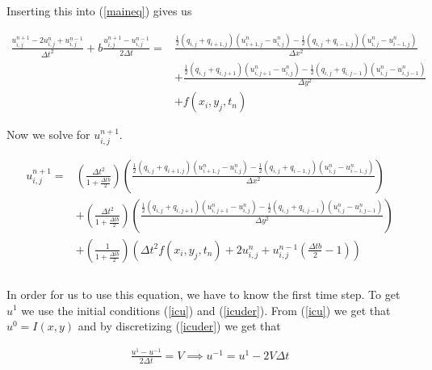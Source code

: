 \documentclass[12pt, a4paper]{article}
\begin{document}
{Inserting this into (\ref{maineq}) gives us

\begin{equation}\label{mainnum}
\begin{aligned}
    \frac{u_{i,j}^{n+1} - 2u_{i,j}^n + u_{i,j}^{n-1}}{\Delta t^2} + b\frac{u_{i,j}^{n+1}- u_{i,j}^{n-1}}{2\Delta t} = &\frac{\frac{1}{2}(q_{i,j} + q_{i+1,j})(u_{i+1,j}^n - u_{i,j}^n) - \frac{1}{2}(q_{i,j} + q_{i-1,j})(u_{i,j}^{n} - u_{i-1,j}^{n})}{\Delta x^2} \\ &+ \frac{\frac{1}{2}(q_{i,j} + q_{i,j+1})(u_{i,j+1}^n - u_{i,j}^n) - \frac{1}{2}(q_{i,j} + q_{i,j-1})(u_{i,j}^{n} - u_{i,j-1}^{n})}{\Delta y^2} \\ &+ f(x_i, y_j, t_n)
\end{aligned}
\end{equation}

Now we solve for \(u_{i,j}^{n+1}\).

\begin{equation}\label{un} 
\begin{aligned}
    u_{i,j}^{n+1} = &\left(\frac{\Delta t^2}{1 + \frac{\Delta tb}{2}}\right)\left(\frac{\frac{1}{2}(q_{i,j} + q_{i+1,j})(u_{i+1,j}^n - u_{i,j}^n) - \frac{1}{2}(q_{i,j} + q_{i-1,j})(u_{i,j}^{n} - u_{i-1,j}^{n})}{\Delta x^2}\right) \\ &+ \left(\frac{\Delta t^2}{1 + \frac{\Delta tb}{2}}\right)\left(\frac{\frac{1}{2}(q_{i,j} + q_{i,j+1})(u_{i,j+1}^n - u_{i,j}^n) - \frac{1}{2}(q_{i,j} + q_{i,j-1})(u_{i,j}^{n} - u_{i,j-1}^{n})}{\Delta y^2}\right) \\ &+ \left(\frac{1}{1 + \frac{\Delta tb}{2}}\right)\left(\Delta t^2 f(x_i, y_j, t_n) + 2u_{i,j}^n + u_{i,j}^{n-1}\left(\frac{\Delta tb}{2} - 1\right)\right)\\\\
\end{aligned}       
\end{equation}      

In order for us to use this equation, we have to know the first time step. To get \(u^1\) we use the initial conditions (\ref{icu}) and (\ref{icuder}). From (\ref{icu}) we get that \(u^0 = I(x, y)\) and by discretizing (\ref{icuder}) we get that 

\begin{equation*}
\begin{aligned}
    \frac{u^1 - u^{-1}}{2 \Delta t} = V 
    \implies u^{-1} = u^1 - 2V \Delta t
\end{aligned}    
\end{equation*}

}
\end{document}

